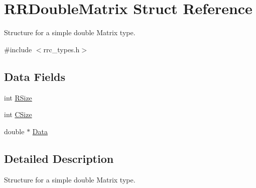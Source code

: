 \hypertarget{struct_r_r_double_matrix}{\section{R\+R\+Double\+Matrix Struct Reference}
\label{struct_r_r_double_matrix}
}


Structure for a simple double Matrix type.  




{\ttfamily \#include $<$rrc\+\_\+types.\+h$>$}

\subsection*{Data Fields}
\begin{DoxyCompactItemize}
\item 
int \hyperlink{struct_r_r_double_matrix_a4d8512c879223c0e0d1522dae38e7819}{R\+Size}
\item 
int \hyperlink{struct_r_r_double_matrix_a17c9a5894aa9cb3789346dcaa9c370bb}{C\+Size}
\item 
double $\ast$ \hyperlink{struct_r_r_double_matrix_a7c5cbda3aa940f4b0d6e8a1679307dfc}{Data}
\end{DoxyCompactItemize}


\subsection{Detailed Description}
Structure for a simple double Matrix type. 

